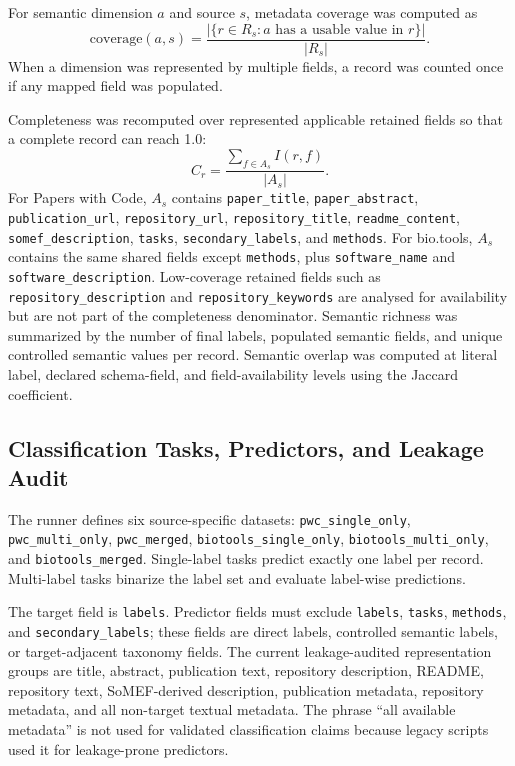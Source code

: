 \documentclass[pdflatex,sn-mathphys-num]{sn-jnl}
\theoremstyle{thmstyleone}%
\theoremstyle{thmstyletwo}%
\theoremstyle{thmstylethree}%
\begin{document}
For semantic dimension \(a\) and source \(s\), metadata coverage was computed as
\[
\mathrm{coverage}(a,s)=\frac{\left|\{r \in R_s : a \text{ has a usable value in } r\}\right|}{|R_s|}.
\]
When a dimension was represented by multiple fields, a record was counted once if any mapped field was populated.

Completeness was recomputed over represented applicable retained fields so that a complete record can reach 1.0:
\[
C_r=\frac{\sum_{f \in A_s} I(r,f)}{|A_s|}.
\]
For Papers with Code, \(A_s\) contains \texttt{paper\_title}, \texttt{paper\_abstract}, \texttt{publication\_url}, \texttt{repository\_url}, \texttt{repository\_title}, \texttt{readme\_content}, \texttt{somef\_description}, \texttt{tasks}, \texttt{secondary\_labels}, and \texttt{methods}. For bio.tools, \(A_s\) contains the same shared fields except \texttt{methods}, plus \texttt{software\_name} and \texttt{software\_description}. Low-coverage retained fields such as \texttt{repository\_description} and \texttt{repository\_keywords} are analysed for availability but are not part of the completeness denominator. Semantic richness was summarized by the number of final labels, populated semantic fields, and unique controlled semantic values per record. Semantic overlap was computed at literal label, declared schema-field, and field-availability levels using the Jaccard coefficient.

\subsection{Classification Tasks, Predictors, and Leakage Audit}
\label{subsec:classification-tasks}

The runner defines six source-specific datasets: \texttt{pwc\_single\_only}, \texttt{pwc\_multi\_only}, \texttt{pwc\_merged}, \texttt{biotools\_single\_only}, \texttt{biotools\_multi\_only}, and \texttt{biotools\_merged}. Single-label tasks predict exactly one label per record. Multi-label tasks binarize the label set and evaluate label-wise predictions.

The target field is \texttt{labels}. Predictor fields must exclude \texttt{labels}, \texttt{tasks}, \texttt{methods}, and \texttt{secondary\_labels}; these fields are direct labels, controlled semantic labels, or target-adjacent taxonomy fields. The current leakage-audited representation groups are title, abstract, publication text, repository description, README, repository text, SoMEF-derived description, publication metadata, repository metadata, and all non-target textual metadata. The phrase ``all available metadata'' is not used for validated classification claims because legacy scripts used it for leakage-prone predictors.
\end{document}
